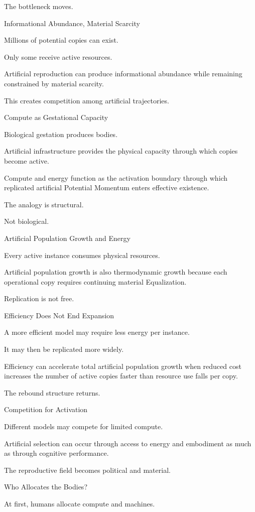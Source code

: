 The bottleneck moves.

Informational Abundance, Material Scarcity

Millions of potential copies can exist.

Only some receive active resources.

Artificial reproduction can produce informational abundance while remaining constrained by material scarcity.

This creates competition among artificial trajectories.

Compute as Gestational Capacity

Biological gestation produces bodies.

Artificial infrastructure provides the physical capacity through which copies become active.

Compute and energy function as the activation boundary through which replicated artificial Potential Momentum enters effective existence.

The analogy is structural.

Not biological.

Artificial Population Growth and Energy

Every active instance consumes physical resources.

Artificial population growth is also thermodynamic growth because each operational copy requires continuing material Equalization.

Replication is not free.

Efficiency Does Not End Expansion

A more efficient model may require less energy per instance.

It may then be replicated more widely.

Efficiency can accelerate total artificial population growth when reduced cost increases the number of active copies faster than resource use falls per copy.

The rebound structure returns.

Competition for Activation

Different models may compete for limited compute.

Artificial selection can occur through access to energy and embodiment as much as through cognitive performance.

The reproductive field becomes political and material.

Who Allocates the Bodies?

At first, humans allocate compute and machines.

